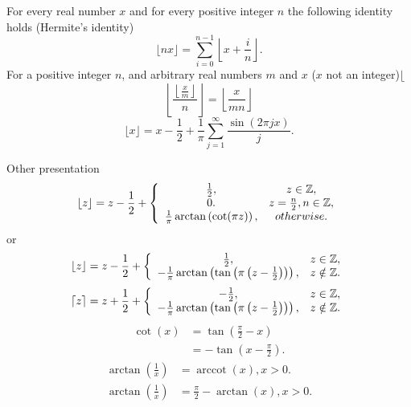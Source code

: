 \documentclass[titlepage,fleqn]{article}%
\providecommand{\U}[1]{\protect\rule{.1in}{.1in}}
\begin{document}
For every real number $x$ and for every positive integer $n$ the following
identity holds (Hermite's identity)%
\[
\lfloor nx\rfloor=%
{\displaystyle\sum\limits_{i=0}^{n-1}}
\left\lfloor x+\frac{i}{n}\right\rfloor .
\]
For a positive integer $n$, and arbitrary real numbers $m$ and $x$ ($x$ not an
integer)$\lfloor$%
\[
\left\lfloor \frac{\left\lfloor \frac{x}{m}\right\rfloor }{n}\right\rfloor
=\left\lfloor \frac{x}{mn}\right\rfloor
\]%
\begin{equation}
\lfloor x\rfloor=x-\frac{1}{2}+\frac{1}{\pi}%
{\displaystyle\sum\limits_{j=1}^{\infty}}
\frac{\sin(2\pi jx)}{j}. \label{Floor1}%
\end{equation}


Other presentation%
\[
\lfloor z\rfloor=z-\frac{1}{2}+\left\{
\begin{array}
[c]{cc}%
\frac{1}{2}, & z\in%
\mathbb{Z}
,\\
0. & z=\frac{n}{2},n\in%
\mathbb{Z}
,\\
\frac{1}{\pi}\arctan\left(  \cot(\pi z)\right)  , & otherwise.
\end{array}
\right.
\]
or%
\[
\lfloor z\rfloor=z-\frac{1}{2}+\left\{
\begin{array}
[c]{cc}%
\frac{1}{2}, & z\in%
\mathbb{Z}
,\\
-\frac{1}{\pi}\arctan\left(  \tan\left(  \pi\left(  z-\frac{1}{2}\right)
\right)  \right)  , & z\notin%
\mathbb{Z}
.
\end{array}
\right.
\]%
\[
\lceil z\rceil=z+\frac{1}{2}+\left\{
\begin{array}
[c]{cc}%
-\frac{1}{2}, & z\in%
\mathbb{Z}
,\\
-\frac{1}{\pi}\arctan\left(  \tan\left(  \pi\left(  z-\frac{1}{2}\right)
\right)  \right)  , & z\notin%
\mathbb{Z}
.
\end{array}
\right.
\]%
\begin{align*}
\cot(x)  &  =\tan\left(  \frac{\pi}{2}-x\right) \\
&  =-\tan\left(  x-\frac{\pi}{2}\right)  .
\end{align*}%
\begin{align*}
\arctan\left(  \frac{1}{x}\right)   &  =\operatorname{arccot}(x),x>0.\\
\arctan\left(  \frac{1}{x}\right)   &  =\frac{\pi}{2}-\arctan\left(  x\right)
,x>0.
\end{align*}%
\end{document}
